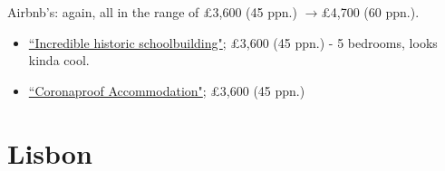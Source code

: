 \documentclass[12pt]{article}
\renewcommand{\to}{$\rightarrow$}
\newcommand{\cost}[2]{\pounds#1 (#2 ppn.)}
\begin{document}
	Airbnb's: again, all in the range of \cost{3,600}{45} \to \cost{4,700}{60}.
	\begin{itemize}
		\item \href{https://www.airbnb.co.uk/rooms/1648803?adults=10&check_in=2022-05-28&check_out=2022-06-05&federated_search_id=eacbb969-9448-48b4-b093-cfbc72c92868&source_impression_id=p3_1648314361_IUXtwtjrC12BznH9}{``Incredible historic schoolbuilding"}; \cost{3,600}{45} - 5 bedrooms, looks kinda cool.
		\item 
		\href{https://www.airbnb.co.uk/rooms/14224936?adults=10&check_in=2022-05-28&check_out=2022-06-05&federated_search_id=eacbb969-9448-48b4-b093-cfbc72c92868&source_impression_id=p3_1648314565_rybHsVBrlbjEOZeR}{``Coronaproof Accommodation"}; \cost{3,600}{45}
	\end{itemize}
	\section{Lisbon}
	
	
	
\end{document}
